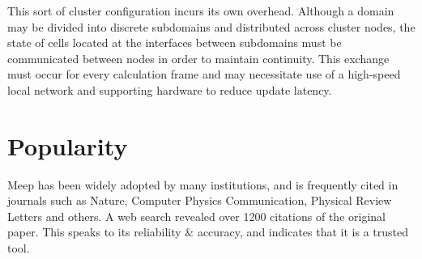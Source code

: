 This sort of cluster configuration incurs its own overhead. Although a domain may be divided into discrete subdomains and distributed across cluster nodes, the state of cells located at the interfaces between subdomains must be communicated between nodes in order to maintain continuity. This exchange must occur for every calculation frame and may necessitate use of a high-speed local network and supporting hardware to reduce update latency.

\section{Popularity}

Meep has been widely adopted by many institutions, and is frequently cited in journals such as Nature\cite{vynck2012photon}\cite{krogstrup2013single}, Computer Physics Communication\cite{liu2012s}, Physical Review Letters\cite{levin2010casimir} and others. A web search revealed over 1200 citations of the original\cite{OskooiRo10} paper. This speaks to its reliability & accuracy, and indicates that it is a trusted tool.








